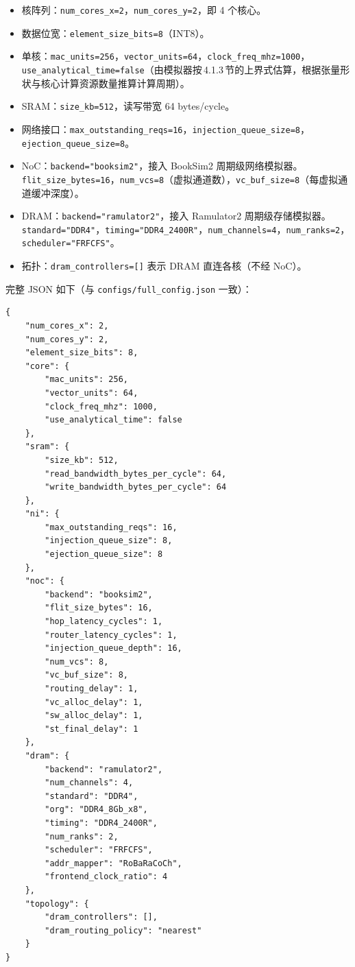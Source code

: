 \begin{itemize}
  \item 核阵列：\texttt{num\_cores\_x=2}，\texttt{num\_cores\_y=2}，即 4 个核心。
  \item 数据位宽：\texttt{element\_size\_bits=8}（INT8）。
  \item 单核：\texttt{mac\_units=256}，\texttt{vector\_units=64}，\texttt{clock\_freq\_mhz=1000}，\texttt{use\_analytical\_time=false}（由模拟器按\,4.1.3\,节的上界式估算，根据张量形状与核心计算资源数量推算计算周期）。
  \item SRAM：\texttt{size\_kb=512}，读写带宽 64 bytes/cycle。
  \item 网络接口：\texttt{max\_outstanding\_reqs=16}，\texttt{injection\_queue\_size=8}，\texttt{ejection\_queue\_size=8}。
  \item NoC：\texttt{backend="booksim2"}，接入 BookSim2 周期级网络模拟器。\texttt{flit\_size\_bytes=16}，\texttt{num\_vcs=8}（虚拟通道数），\texttt{vc\_buf\_size=8}（每虚拟通道缓冲深度）。
  \item DRAM：\texttt{backend="ramulator2"}，接入 Ramulator2 周期级存储模拟器。\texttt{standard="DDR4"}，\texttt{timing="DDR4\_2400R"}，\texttt{num\_channels=4}，\texttt{num\_ranks=2}，\texttt{scheduler="FRFCFS"}。
  \item 拓扑：\texttt{dram\_controllers=[]} 表示 DRAM 直连各核（不经 NoC）。
\end{itemize}

完整 JSON 如下（与 \texttt{configs/full\_config.json} 一致）：

{\small
\begin{verbatim}
{
    "num_cores_x": 2,
    "num_cores_y": 2,
    "element_size_bits": 8,
    "core": {
        "mac_units": 256,
        "vector_units": 64,
        "clock_freq_mhz": 1000,
        "use_analytical_time": false
    },
    "sram": {
        "size_kb": 512,
        "read_bandwidth_bytes_per_cycle": 64,
        "write_bandwidth_bytes_per_cycle": 64
    },
    "ni": {
        "max_outstanding_reqs": 16,
        "injection_queue_size": 8,
        "ejection_queue_size": 8
    },
    "noc": {
        "backend": "booksim2",
        "flit_size_bytes": 16,
        "hop_latency_cycles": 1,
        "router_latency_cycles": 1,
        "injection_queue_depth": 16,
        "num_vcs": 8,
        "vc_buf_size": 8,
        "routing_delay": 1,
        "vc_alloc_delay": 1,
        "sw_alloc_delay": 1,
        "st_final_delay": 1
    },
    "dram": {
        "backend": "ramulator2",
        "num_channels": 4,
        "standard": "DDR4",
        "org": "DDR4_8Gb_x8",
        "timing": "DDR4_2400R",
        "num_ranks": 2,
        "scheduler": "FRFCFS",
        "addr_mapper": "RoBaRaCoCh",
        "frontend_clock_ratio": 4
    },
    "topology": {
        "dram_controllers": [],
        "dram_routing_policy": "nearest"
    }
}
\end{verbatim}
}

